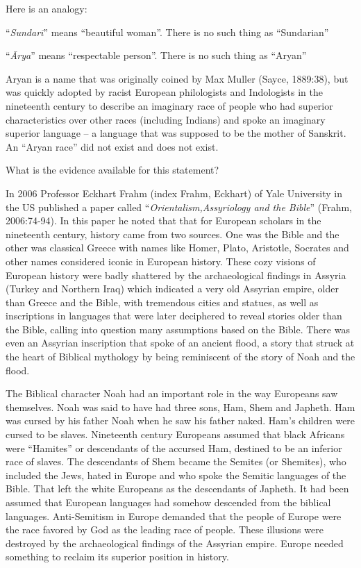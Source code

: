 Here is an analogy:

“\textit{Sundarī}” means “beautiful woman”. There is no such thing as “Sundarian”

“\textit{Ārya}” means “respectable person”. There is no such thing as “Aryan”

Aryan is a name that was originally coined by Max Muller (Sayce, 1889:38), but was quickly adopted by racist European philologists and Indologists in the nineteenth century to describe an imaginary race of people who had superior characteristics over other races (including Indians) and spoke an imaginary superior language – a language that was supposed to be the mother of Sanskrit. An “Aryan race” did not exist and does not exist.

What is the evidence available for this statement?

In 2006 Professor Eckhart Frahm (index Frahm, Eckhart) of Yale University in the US published a paper called “\textit{Orientalism,Assyriology and the Bible}” (Frahm, 2006:74-94). In this paper he noted that that for European scholars in the nineteenth century, history came from two sources. One was the Bible and the other was classical Greece with names like Homer, Plato, Aristotle, Socrates and other names considered iconic in European history. These cozy visions of European history were badly shattered by the archaeological findings in Assyria (Turkey and Northern Iraq) which indicated a very old Assyrian empire, older than Greece and the Bible, with tremendous cities and statues, as well as inscriptions in languages that were later deciphered to reveal stories older than the Bible, calling into question many assumptions based on the Bible. There was even an Assyrian inscription that spoke of an ancient flood, a story that struck at the heart of Biblical mythology by being reminiscent of the story of Noah and the flood.

The Biblical character Noah had an important role in the way Europeans saw themselves. Noah was said to have had three sons, Ham, Shem and Japheth. Ham was cursed by his father Noah when he saw his father naked. Ham’s children were cursed to be slaves. Nineteenth century Europeans assumed that black Africans were “Hamites” or descendants of the accursed Ham, destined to be an inferior race of slaves. The descendants of Shem became the Semites (or Shemites), who included the Jews, hated in Europe and who spoke the Semitic languages of the Bible. That left the white Europeans as the descendants of Japheth. It had been assumed that European languages had somehow descended from the biblical languages. Anti-Semitism in Europe demanded that the people of Europe were the race favored by God as the leading race of people. These illusions were destroyed by the archaeological findings of the Assyrian empire. Europe needed something to reclaim its superior position in history.

